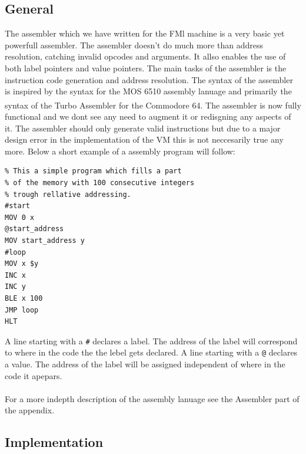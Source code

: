 \documentclass{article}
\newcommand{\V}{\verb}
\begin{document}
\subsection{General}
The assembler which we have written for the FMl machine is a very basic yet
powerfull assembler. The assembler doesn't do much more than address
resolution, catching invalid opcodes and arguments. It allso enables the use of
both label pointers and value pointers. The main tasks of the assembler is the instruction code generation and
address resolution. The syntax of the assembler is inspired by the syntax for
the MOS 6510 assembly lanuage and primarily the syntax of the Turbo
Assembler\textsuperscript{\cite{tasm}} for the Commodore
64\textsuperscript{\cite{c64}}. The assembler is now fully functional and  we
dont see any need to augment it or redisgning any aspects of it. The assembler should only generate valid instructions but due to a major design error in the
implementation of the VM this is not neccesarily true any more. Below a short
example of a assembly program will follow:
\begin{verbatim}
% This a simple program which fills a part 
% of the memory with 100 consecutive integers
% trough rellative addressing.
#start
MOV 0 x
@start_address
MOV start_address y
#loop
MOV x $y
INC x
INC y
BLE x 100
JMP loop
HLT
\end{verbatim}
A line starting with a \V+#+ declares a label. The address of the label will
correspond to where in the code the the lebel gets declared.
A line starting with a \V+@+ declares a value. The address of the label will be
assigned independent of where in the code it apepars.
\\
\\
For a more indepth description of the assembly lanuage see the Assembler
part of the appendix.

\subsection{Implementation}
\end{document}
